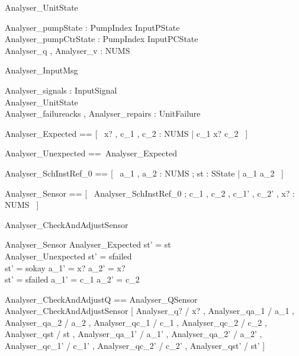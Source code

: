 \documentclass{article}
\begin{document}
\begin{schema}{Analyser\_UnitState}

 Analyser\_pumpState : PumpIndex \fun InputPState \\
 Analyser\_pumpCtrState : PumpIndex \fun InputPCState \\
 Analyser\_q , Analyser\_v : NUMS
\end{schema}

\begin{schema}{Analyser\_InputMsg}

 Analyser\_signals : \power InputSignal \\
 Analyser\_UnitState \\
 Analyser\_failureacks , Analyser\_repairs : \power UnitFailure
\end{schema}

\begin{zed}
	Analyser\_Expected == [~  x? , c\_1 , c\_2 : NUMS | c\_1 \leq x? \leq c\_2  ~]
\end{zed}

\begin{zed}
	Analyser\_Unexpected ==~\lnot Analyser\_Expected
\end{zed}

\begin{zed}
	Analyser\_SchInstRef\_0 == [~  a\_1 , a\_2 : NUMS ; st : SState | a\_1 \leq a\_2  ~]
\end{zed}

\begin{zed}
	Analyser\_Sensor == [~  \Delta Analyser\_SchInstRef\_0 ; c\_1 , c\_2 , c\_1' , c\_2' , x? : NUMS  ~]
\end{zed}

\begin{schema}{Analyser\_CheckAndAdjustSensor}

 Analyser\_Sensor 
\where
 Analyser\_Expected \implies st' = st \\
 Analyser\_Unexpected \implies st' = sfailed \\
 st' = sokay \implies a\_1' = x? \land a\_2' = x? \\
 st' = sfailed \implies a\_1' = c\_1 \land a\_2' = c\_2
\end{schema}

\begin{zed}
	Analyser\_CheckAndAdjustQ == Analyser\_QSensor \land Analyser\_CheckAndAdjustSensor [ Analyser\_q? / x? , Analyser\_qa\_1 / a\_1 , Analyser\_qa\_2 / a\_2 , Analyser\_qc\_1 / c\_1 , Analyser\_qc\_2 / c\_2 , Analyser\_qst / st , Analyser\_qa\_1' / a\_1' , Analyser\_qa\_2' / a\_2' , Analyser\_qc\_1' / c\_1' , Analyser\_qc\_2' / c\_2' , Analyser\_qst' / st' ]
\end{zed}
\end{document}
